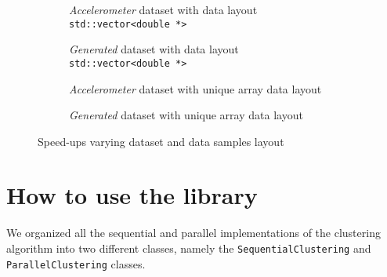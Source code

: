 \documentclass{article}
\begin{document}
\begin{figure}[H]
\begin{minipage}{\linewidth}
\centering
\begin{subfigure}[t]{.47\linewidth}%
%
\setlength{\abovecaptionskip}{-1pt}%
\caption*{\textit{Accelerometer} dataset with data layout \texttt{std::vector<double *>}}%
\end{subfigure}%
%
\hspace{5mm}%
%
\begin{subfigure}[t]{.47\linewidth}%
%
\setlength{\abovecaptionskip}{-1pt}%
\caption*{\textit{Generated} dataset with data layout \texttt{std::vector<double *>}}%
\end{subfigure}%
\end{minipage}
%
\vspace{-2pt}%
%
\begin{minipage}{\linewidth}
\centering
\begin{subfigure}[t]{.47\linewidth}%
%
\setlength{\abovecaptionskip}{-1pt}%
\caption*{\textit{Accelerometer} dataset with unique array data layout}%
\end{subfigure}%
%
\hspace{5mm}%
%
\begin{subfigure}[t]{.47\linewidth}%
%
\setlength{\abovecaptionskip}{-1pt}%
\caption*{\textit{Generated} dataset with unique array data layout}%
\end{subfigure}%
\end{minipage}
%
%
\begin{subfigure}{.47\linewidth}%
\hspace*{6pt}
%
\setlength{\abovecaptionskip}{0pt}%
\end{subfigure}%
\setlength{\abovecaptionskip}{2pt}%
\caption*{Speed-ups varying dataset and data samples layout}
\end{figure}

\vspace{-18pt}
\hypertarget{how-to-use-the-library}{
\section{How to use the library}
\label{how-to-use-the-library}}

We organized all the sequential and parallel implementations of the clustering algorithm into two
different classes, namely the \texttt{SequentialClustering} and \texttt{ParallelClustering} classes.
\end{document}
